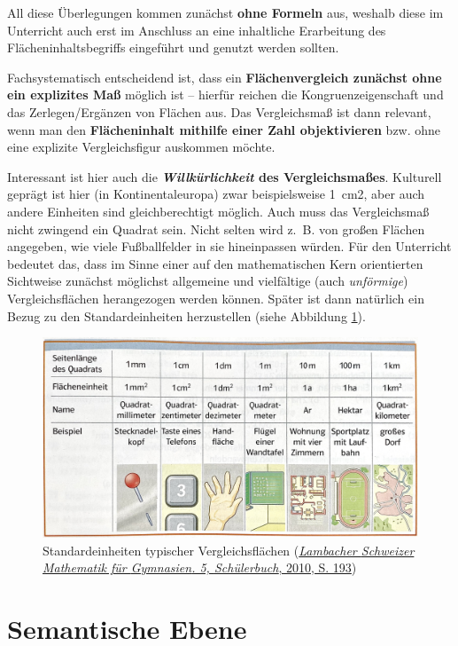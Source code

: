 \documentclass[
]{scrbook}
\theoremstyle{definition}
\theoremstyle{definition}
\theoremstyle{definition}
\theoremstyle{definition}
\theoremstyle{remark}
\begin{document}
All diese Überlegungen kommen zunächst \textbf{ohne Formeln} aus, weshalb diese im Unterricht auch erst im Anschluss an eine inhaltliche Erarbeitung des Flächeninhaltsbegriffs eingeführt und genutzt werden sollten.

Fachsystematisch entscheidend ist, dass ein \textbf{Flächenvergleich zunächst ohne ein explizites Maß} möglich ist -- hierfür reichen die Kongruenzeigenschaft und das Zerlegen/Ergänzen von Flächen aus. Das Vergleichsmaß ist dann relevant, wenn man den \textbf{Flächeninhalt mithilfe einer Zahl objektivieren} bzw. ohne eine explizite Vergleichsfigur auskommen möchte.

Interessant ist hier auch die \textbf{\emph{Willkürlichkeit} des Vergleichsmaßes}. Kulturell geprägt ist hier (in Kontinentaleuropa) zwar beispielsweise 1~cm2, aber auch andere Einheiten sind gleichberechtigt möglich. Auch muss das Vergleichsmaß nicht zwingend ein Quadrat sein. Nicht selten wird z.~B. von großen Flächen angegeben, wie viele Fußballfelder in sie hineinpassen würden. Für den Unterricht bedeutet das, dass im Sinne einer auf den mathematischen Kern orientierten Sichtweise zunächst möglichst allgemeine und vielfältige (auch \emph{unförmige}) Vergleichsflächen herangezogen werden können. Später ist dann natürlich ein Bezug zu den Standardeinheiten herzustellen (siehe Abbildung \ref{fig:FlaecheEinheiten}).



\begin{figure}

{\centering \includegraphics[width=0.75\linewidth]{pictures/5-Einheiten} 

}

\caption{Standardeinheiten typischer Vergleichsflächen (\protect\hyperlink{ref-Lambacher2010}{\emph{Lambacher {Schweizer} {Mathematik} für {Gymnasien}. 5, {Schülerbuch}}, 2010, S. 193})}\label{fig:FlaecheEinheiten}
\end{figure}

\hypertarget{semantische-ebene-1}{%
\section{Semantische Ebene}\label{semantische-ebene-1}}
\end{document}
